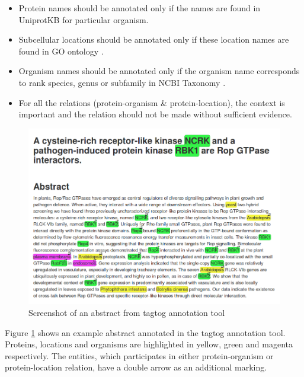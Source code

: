 \begin{itemize}

\item Protein names should be annotated only if the names are found in UniprotKB \cite{magrane2011uniprot} for particular organism.

\item Subcellular locations should be annotated only if these location names are found in GO ontology \cite{ashburner2000gene}.

\item Organism names should be annotated only if the organism name corresponds to rank species, genus or subfamily in NCBI Taxonomy \cite{ncbiTaxonomy}.

\item For all the relations (protein-organism \& protein-location), the context is  important and the relation should not be made without sufficient evidence.

\end{itemize}


\begin{figure}
\centering
\includegraphics[scale=0.4]{figures/tagtog_screenshot.png}
\caption{Screenshot of an abstract from tagtog annotation tool}\label{fig:tagtogScreenshot}
\end{figure}

Figure \ref{fig:tagtogScreenshot} shows an example abstract annotated in the tagtog annotation tool. Proteins, locations and organisms are highlighted in yellow, green and magenta respectively. The entities, which participates in either protein-organism or protein-location relation, have a double arrow as an additional marking.

